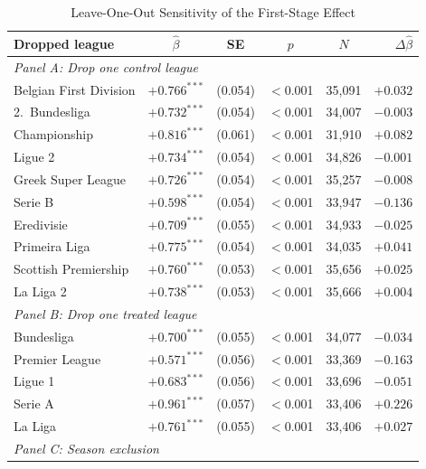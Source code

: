 \begin{table}[htbp]
\centering
\begin{threeparttable}
\caption{Leave-One-Out Sensitivity of the First-Stage Effect}
\label{tab:sensitivity}
\begin{tabular}{lccccr}
\toprule
Dropped league & $\hat{\beta}$ & SE & $p$ & $N$ & $\Delta\hat{\beta}$ \\
\midrule
\multicolumn{6}{l}{\textit{Panel A: Drop one control league}} \\[3pt]
Belgian First Division   & $+0.766^{***}$ & (0.054) & $<$0.001 & 35,091 & $+0.032$ \\
2.\ Bundesliga           & $+0.732^{***}$ & (0.054) & $<$0.001 & 34,007 & $-0.003$ \\
Championship             & $+0.816^{***}$ & (0.061) & $<$0.001 & 31,910 & $+0.082$ \\
Ligue 2                  & $+0.734^{***}$ & (0.054) & $<$0.001 & 34,826 & $-0.001$ \\
Greek Super League       & $+0.726^{***}$ & (0.054) & $<$0.001 & 35,257 & $-0.008$ \\
Serie B                  & $+0.598^{***}$ & (0.054) & $<$0.001 & 33,947 & $-0.136$ \\
Eredivisie               & $+0.709^{***}$ & (0.055) & $<$0.001 & 34,933 & $-0.025$ \\
Primeira Liga            & $+0.775^{***}$ & (0.054) & $<$0.001 & 34,035 & $+0.041$ \\
Scottish Premiership     & $+0.760^{***}$ & (0.053) & $<$0.001 & 35,656 & $+0.025$ \\
La Liga 2                & $+0.738^{***}$ & (0.053) & $<$0.001 & 35,666 & $+0.004$ \\[3pt]
\midrule
\multicolumn{6}{l}{\textit{Panel B: Drop one treated league}} \\[3pt]
Bundesliga               & $+0.700^{***}$ & (0.055) & $<$0.001 & 34,077 & $-0.034$ \\
Premier League           & $+0.571^{***}$ & (0.056) & $<$0.001 & 33,369 & $-0.163$ \\
Ligue 1                  & $+0.683^{***}$ & (0.056) & $<$0.001 & 33,696 & $-0.051$ \\
Serie A                  & $+0.961^{***}$ & (0.057) & $<$0.001 & 33,406 & $+0.226$ \\
La Liga                  & $+0.761^{***}$ & (0.055) & $<$0.001 & 33,406 & $+0.027$ \\[3pt]
\midrule
\multicolumn{6}{l}{\textit{Panel C: Season exclusion}} \\[3pt]

\end{tabular}
\end{threeparttable}
\end{table}
